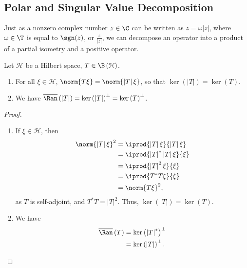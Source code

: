 \documentclass[10pt]{mypackage}
\begin{document}
\subsection{Polar and Singular Value Decomposition}%
Just as a nonzero complex number $z\in \C$ can be written as $z = \omega \left\vert z \right\vert$, where $\omega\in \T$ is equal to $\sgn(z)$, or $\frac{z}{\left\vert z \right\vert}$, we can decompose an operator into a product of a partial isometry and a positive operator.
\begin{lemma}
  Let $\mathcal{H}$ be a Hilbert space, $T\in \B\left( \mathcal{H} \right)$.
  \begin{enumerate}[(1)]
    \item For all $\xi\in \mathcal{H}$, $\norm{T\xi} = \norm{\left\vert T \right\vert\xi}$, so that $\ker\left( \left\vert T \right\vert \right)= \ker\left( T \right)$.
    \item We have $\overline{\Ran}\left( \left\vert T \right\vert \right) = \ker\left( \left\vert T \right\vert \right)^{\perp} = \ker\left( T \right)^{\perp}$.
  \end{enumerate}
\end{lemma}
\begin{proof}\hfill
  \begin{enumerate}[(1)]
    \item If $\xi\in \mathcal{H}$, then
      \begin{align*}
        \norm{\left\vert T \right\vert\xi} ^2 &= \iprod{\left\vert T \right\vert\xi}{\left\vert T \right\vert\xi}\\
                                              &= \iprod{\left\vert T \right\vert^{\ast}\left\vert T \right\vert\xi}{\xi}\\
                                              &= \iprod{\left\vert T \right\vert^2\xi}{\xi}\\
                                              &= \iprod{T^{\ast}T\xi}{\xi}\\
                                              &= \norm{T\xi}^2,
      \end{align*}
      as $T$ is self-adjoint, and $T^{\ast}T = \left\vert T \right\vert^2$. Thus, $\ker\left( \left\vert T \right\vert \right) = \ker\left( T \right)$.
    \item We have
      \begin{align*}
        \overline{\Ran}\left( T \right) &= \ker\left( \left\vert T \right\vert^{\ast} \right)^{\perp}\\
                                        &= \ker\left( \left\vert T \right\vert \right)^{\perp}.
      \end{align*}
  \end{enumerate}
\end{proof}
\end{document}

